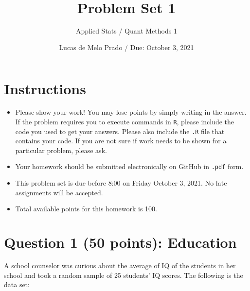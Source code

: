 \documentclass[12pt,letterpaper]{article}
\title{Problem Set 1}
\author{Applied Stats / Quant Methods 1}
\date{Lucas de Melo Prado / Due: October 3, 2021}
\begin{document}
	\maketitle
	
	\section*{Instructions}
	\begin{itemize}
		\item Please show your work! You may lose points by simply writing in the answer. If the problem requires you to execute commands in \texttt{R}, please include the code you used to get your answers. Please also include the \texttt{.R} file that contains your code. If you are not sure if work needs to be shown for a particular problem, please ask.
		\item Your homework should be submitted electronically on GitHub in \texttt{.pdf} form.
		\item This problem set is due before 8:00 on Friday October 3, 2021. No late assignments will be accepted.
		\item Total available points for this homework is 100.
	\end{itemize}
	
	\vspace{1cm}
	\section*{Question 1 (50 points): Education}
	
	A school counselor was curious about the average of IQ of the students in her school and took a random sample of 25 students' IQ scores. The following is the data set:\\
	\vspace{.5cm}
	
	  
	
	\newpage
	
\end{document}
